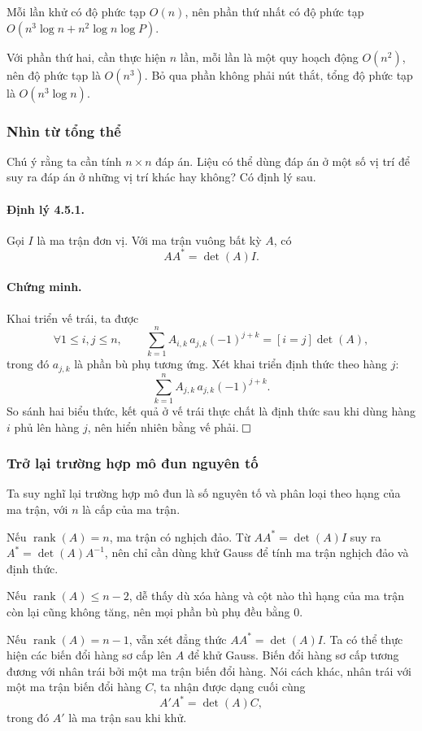 \documentclass[11pt]{article}
\newcommand{\proofbox}{\ensuremath{\vcenter{\hrule height 0.45pt
  \hbox{\vrule width 0.45pt height 6pt\kern 6pt\vrule width 0.45pt}
  \hrule height 0.45pt}}}
\begin{document}
Mỗi lần khử có độ phức tạp \(O(n)\), nên phần thứ nhất có độ phức tạp
\(O(n^3\log n+n^2\log n\log P)\).

Với phần thứ hai, cần thực hiện \(n\) lần, mỗi lần là một quy hoạch động
\(O(n^2)\), nên độ phức tạp là \(O(n^3)\). Bỏ qua phần không phải nút thắt, tổng
độ phức tạp là \(O(n^3\log n)\).

\subsubsection{Nhìn từ tổng thể}

Chú ý rằng ta cần tính \(n\times n\) đáp án. Liệu có thể dùng đáp án ở một số vị
trí để suy ra đáp án ở những vị trí khác hay không? Có định lý sau.

\paragraph{Định lý 4.5.1.}
Gọi \(I\) là ma trận đơn vị. Với ma trận vuông bất kỳ \(A\), có
\[
  AA^\ast=\det(A)I.
\]

\paragraph{Chứng minh.}
Khai triển vế trái, ta được
\[
  \forall 1\le i,j\le n,\qquad
  \sum_{k=1}^n A_{i,k}\,a_{j,k}(-1)^{j+k}=[i=j]\det(A),
\]
trong đó \(a_{j,k}\) là phần bù phụ tương ứng. Xét khai triển định thức theo
hàng \(j\):
\[
  \sum_{k=1}^n A_{j,k}\,a_{j,k}(-1)^{j+k}.
\]
So sánh hai biểu thức, kết quả ở vế trái thực chất là định thức sau khi dùng
hàng \(i\) phủ lên hàng \(j\), nên hiển nhiên bằng vế phải. \(\proofbox\)

\subsubsection{Trở lại trường hợp mô đun nguyên tố}

Ta suy nghĩ lại trường hợp mô đun là số nguyên tố và phân loại theo hạng của ma
trận, với \(n\) là cấp của ma trận.

Nếu \(\operatorname{rank}(A)=n\), ma trận có nghịch đảo. Từ
\(AA^\ast=\det(A)I\) suy ra \(A^\ast=\det(A)A^{-1}\), nên chỉ cần dùng khử Gauss
để tính ma trận nghịch đảo và định thức.

Nếu \(\operatorname{rank}(A)\le n-2\), dễ thấy dù xóa hàng và cột nào thì hạng
của ma trận còn lại cũng không tăng, nên mọi phần bù phụ đều bằng \(0\).

Nếu \(\operatorname{rank}(A)=n-1\), vẫn xét đẳng thức
\(AA^\ast=\det(A)I\). Ta có thể thực hiện các biến đổi hàng sơ cấp lên \(A\) để
khử Gauss. Biến đổi hàng sơ cấp tương đương với nhân trái bởi một ma trận biến
đổi hàng. Nói cách khác, nhân trái với một ma trận biến đổi hàng \(C\), ta nhận
được dạng cuối cùng
\[
  A'A^\ast=\det(A)C,
\]
trong đó \(A'\) là ma trận sau khi khử.
\end{document}
